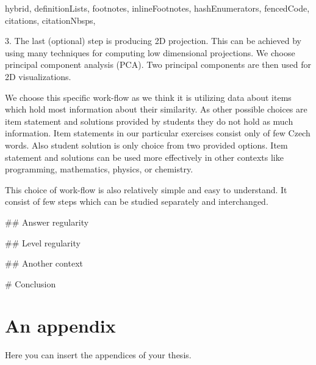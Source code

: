 \documentclass[
  digital, %
  table,   %
  nolof,     %
  nolot,     %
  nocover
]{fithesis3}
\begin{document}
\begin{markdown*}{%
  hybrid,
  definitionLists,
  footnotes,
  inlineFootnotes,
  hashEnumerators,
  fencedCode,
  citations,
  citationNbsps,
}

3. The last (optional) step is producing 2D projection. This can be achieved by using many techniques for computing low dimensional projections. We choose principal component analysis (PCA). Two principal components are then used for 2D visualizations.


We choose this specific work-flow as we think it is utilizing data about items which hold most information about their similarity. As other possible choices are item statement and solutions provided by students they do not hold as much information. Item statements in our particular exercises consist only of few Czech words. Also student solution is only choice from two provided options. Item statement and solutions can be used more effectively in other contexts like programming, mathematics, physics, or chemistry.

This choice of work-flow is also relatively simple and easy to understand. It consist of few steps which can be studied separately and interchanged.

## Answer regularity




## Level regularity




## Another context



# Conclusion




\end{markdown*}

  \makeatletter\thesis@blocks@clear\makeatother
  \printindex

\appendix %
\chapter{An appendix}
Here you can insert the appendices of your thesis.
\end{document}
